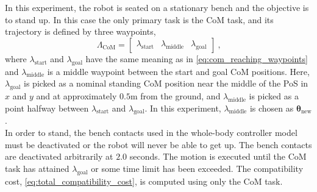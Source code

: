 \documentclass[12pt,a4paper,twoside]{article}
\newcommand{\bs}[1]{\boldsymbol{#1}}
\newcommand{\tc}{\ \text{,}}
\newcommand{\obj}{\bs{\theta}}
\begin{document}
    In this experiment, the robot is seated on a stationary bench and the objective is to stand up. In this case the only primary task is the CoM task, and its trajectory is defined by three waypoints,
    \begin{equation}
        \Lambda_{\text{CoM}} = \begin{bmatrix} \lambda_{\text{start}} & \lambda_{\text{middle}} & \lambda_{\text{goal}} \end{bmatrix} \tc
        \label{eq:com_standing_waypoints}
    \end{equation}
    where $\lambda_{\text{start}}$ and $\lambda_{\text{goal}}$ have the same meaning as in \eqref{eq:com_reaching_waypoints} and $\lambda_{\text{middle}}$ is a middle waypoint between the start and goal CoM positions. Here, $\lambda_{\text{goal}}$ is picked as a nominal standing CoM position near the middle of the PoS in $x$ and $y$ and at approximately $0.5$m from the ground,
    and $\lambda_{\text{middle}}$ is picked as a point halfway between $\lambda_{\text{start}}$ and $\lambda_{\text{goal}}$. In this experiment, $\lambda_{\text{middle}}$ is chosen as $\obj_{\text{new}}$.\\

    In order to stand, the bench contacts used in the whole-body controller model must be deactivated or the robot will never be able to get up. The bench contacts are deactivated arbitrarily at $2.0$ seconds. The motion is executed until the CoM task has attained $\lambda_{\text{goal}}$ or some time limit has been exceeded. The compatibility cost, \eqref{eq:total_compatibility_cost}, is computed using only the CoM task.
\end{document}
